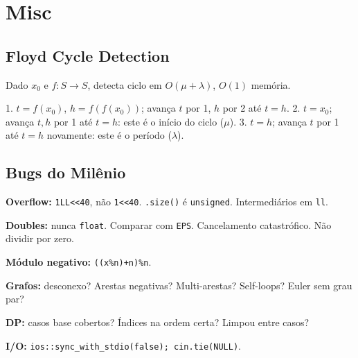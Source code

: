 \setlength{\parindent}{0pt}

\section{Misc}

\subsection{Floyd Cycle Detection}

Dado $x_0$ e $f:S\to S$, detecta ciclo em $O(\mu+\lambda)$, $O(1)$ memória.

1. $t=f(x_0)$, $h=f(f(x_0))$; avança $t$ por 1, $h$ por 2 até $t=h$.
2. $t=x_0$; avança $t,h$ por 1 até $t=h$: este é o início do ciclo ($\mu$).
3. $t=h$; avança $t$ por 1 até $t=h$ novamente: este é o período ($\lambda$).

\subsection{Bugs do Milênio}

\textbf{Overflow:} \texttt{1LL<<40}, não \texttt{1<<40}. \texttt{.size()} é \texttt{unsigned}. Intermediários em \texttt{ll}.

\textbf{Doubles:} nunca \texttt{float}. Comparar com \texttt{EPS}. Cancelamento catastrófico. Não dividir por zero.

\textbf{Módulo negativo:} \texttt{((x\%n)+n)\%n}.

\textbf{Grafos:} desconexo? Arestas negativas? Multi-arestas? Self-loops? Euler sem grau par?

\textbf{DP:} casos base cobertos? Índices na ordem certa? Limpou entre casos?

\textbf{I/O:} \texttt{ios::sync\_with\_stdio(false); cin.tie(NULL)}.
